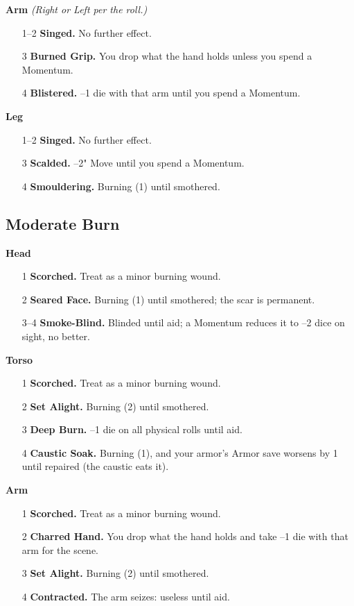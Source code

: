 \textbf{Arm} \textit{(Right or Left per the roll.)}
\begin{itemize}
    \item[1--2] \textbf{Singed.} No further effect.
    \item[3] \textbf{Burned Grip.} You drop what the hand holds unless you spend a Momentum.
    \item[4] \textbf{Blistered.} --1 die with that arm until you spend a Momentum.
\end{itemize}

\textbf{Leg}
\begin{itemize}
    \item[1--2] \textbf{Singed.} No further effect.
    \item[3] \textbf{Scalded.} --2" Move until you spend a Momentum.
    \item[4] \textbf{Smouldering.} Burning (1) until smothered.
\end{itemize}

\subsection{Moderate Burn}

\textbf{Head}
\begin{itemize}
    \item[1] \textbf{Scorched.} Treat as a minor burning wound.
    \item[2] \textbf{Seared Face.} Burning (1) until smothered; the scar is permanent.
    \item[3--4] \textbf{Smoke-Blind.} Blinded until aid; a Momentum reduces it to --2 dice on sight, no better.
\end{itemize}

\textbf{Torso}
\begin{itemize}
    \item[1] \textbf{Scorched.} Treat as a minor burning wound.
    \item[2] \textbf{Set Alight.} Burning (2) until smothered.
    \item[3] \textbf{Deep Burn.} --1 die on all physical rolls until aid.
    \item[4] \textbf{Caustic Soak.} Burning (1), and your armor's Armor save worsens by 1 until repaired (the caustic eats it).
\end{itemize}

\textbf{Arm}
\begin{itemize}
    \item[1] \textbf{Scorched.} Treat as a minor burning wound.
    \item[2] \textbf{Charred Hand.} You drop what the hand holds and take --1 die with that arm for the scene.
    \item[3] \textbf{Set Alight.} Burning (2) until smothered.
    \item[4] \textbf{Contracted.} The arm seizes: useless until aid.
\end{itemize}

